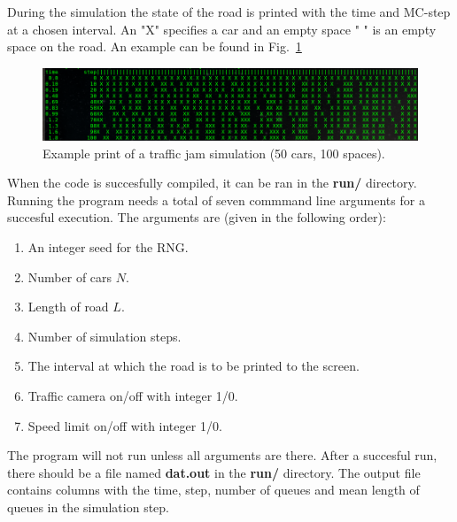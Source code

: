 \documentclass[a4paper,12pt]{article}
\begin{document}
During the simulation the state of the road is printed with the time and MC-step at a chosen interval. An "X" specifies a car and an empty space " " is an empty space on the road. An example can be found in Fig.~\ref{pic:ex}

\begin{figure}[h]
\centering
\includegraphics[width=\columnwidth]{road1.png}
\caption{Example print of a traffic jam simulation (50 cars, 100 spaces).}
\label{pic:ex}
\end{figure}

When the code is succesfully compiled, it can be ran in the {\bf{run/}} directory. Running the program needs a total of seven commmand line arguments for a succesful execution. The arguments are (given in the following order):

\begin{enumerate}
\item An integer seed for the RNG.
\item Number of cars $N$.
\item Length of road $L$.
\item Number of simulation steps.
\item The interval at which the road is to be printed to the screen.
\item Traffic camera on/off with integer 1/0.
\item Speed limit on/off with integer 1/0.
\end{enumerate} 

The program will not run unless all arguments are there. After a succesful run, there should be a file named {\bf{dat.out}} in the {\bf{run/}} directory. The output file contains columns with the time, step, number of queues and mean length of queues in the simulation step.
\end{document}
